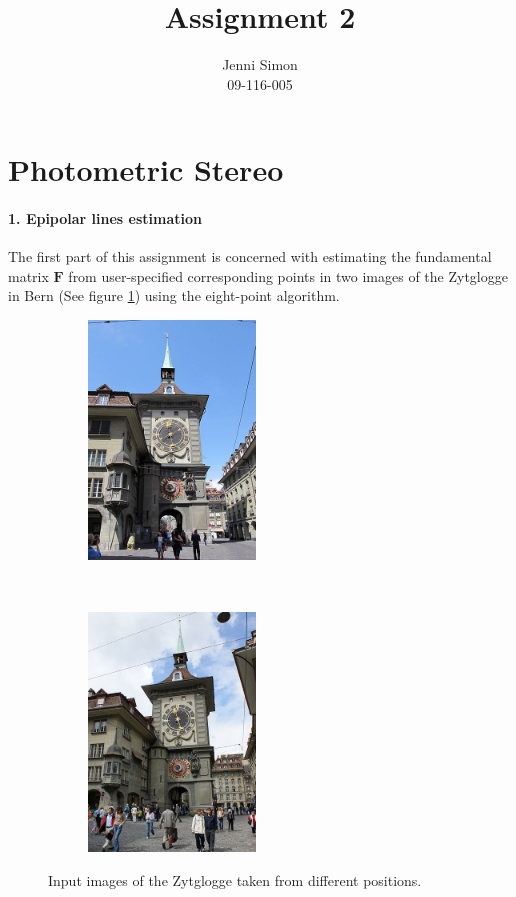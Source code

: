 \documentclass{paper}
\title{Assignment 2}
\author{Jenni Simon\\09-116-005}
\begin{document}
\maketitle


%

\section*{Photometric Stereo}



\paragraph{1. Epipolar lines estimation}
The first part of this assignment is concerned with estimating the fundamental matrix $\mathbf{F}$ from user-specified corresponding points in two images of the Zytglogge in Bern (See figure \ref{fig:zytglogge}) using the eight-point algorithm. 

\begin{figure}[h!]
    \centering
    \begin{subfigure}[]{0.5\textwidth}
        \centering
        \includegraphics[height=2.5in]{left.jpg}
    \end{subfigure}%
    ~ 
    \begin{subfigure}[]{0.5\textwidth}
        \centering
        \includegraphics[height=2.5in]{right.jpg}
    \end{subfigure}
    \caption{Input images of the Zytglogge taken from different  positions.}
\label{fig:zytglogge}
\end{figure}
\end{document}

